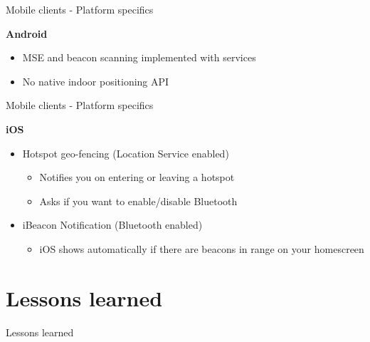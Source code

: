 \documentclass[11pt]{beamer}
\begin{document}
\begin{frame}{Mobile clients - Platform specifics}

  \textbf{Android}

  \begin{itemize}

    \item MSE and beacon scanning implemented with services
    \item No native indoor positioning API

  \end{itemize}

\end{frame}


\begin{frame}{Mobile clients - Platform specifics}

  \textbf{iOS}

  \begin{itemize}
    \item Hotspot geo-fencing (Location Service enabled)\\[1em]
    \begin{itemize}
         \item Notifies you on entering or leaving a hotspot
         \item Asks if you want to enable/disable Bluetooth
     \end{itemize}
     \pause
    \item iBeacon Notification (Bluetooth enabled)\\[1em]
    \begin{itemize}
         \item iOS shows automatically if there are beacons in range on your homescreen
     \end{itemize}
  \end{itemize}
\end{frame}


\section{Lessons learned}

\begin{frame}{}

  \begin{center}

    {\Huge Lessons learned}

  \end{center}

\end{frame}
\end{document}
